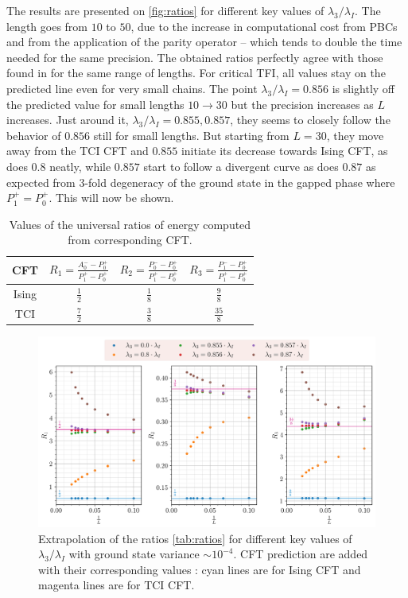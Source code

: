 	The results are presented on \autoref{fig:ratios} for different key values of $\lambda_3/\lambda_I$. The length goes from $10$ to $50$, due to the increase in computational cost from PBCs and from the application of the parity operator -- which tends to double the time needed for the same precision. The obtained ratios perfectly agree with those found in \cite{obrien2018} for the same range of lengths. For critical TFI, all values stay on the predicted line even for very small chains. The point $\lambda_3/\lambda_I=0.856$ is slightly off the predicted value for small lengths $10\to 30$ but the precision increases as $L$ increases. Just around it, $\lambda_3/\lambda_I=0.855, 0.857$, they seems to closely follow the behavior of $0.856$ still for small lengths. But starting from $L=30$, they move away from the TCI CFT and $0.855$ initiate its decrease towards Ising CFT, as does $0.8$ neatly, while $0.857$ start to follow a divergent curve as does $0.87$ as expected from $3$-fold degeneracy of the ground state in the gapped phase where $P^+_1 = P^+_0$. This will now be shown.

	\begin{table}[h!]
		\centering
		\renewcommand{\arraystretch}{1.3}
		\begin{tabular}{c|ccc}
			CFT & $R_1 = \frac{A^-_0 - P^+_0}{P^+_1 - P^+_0}$ & $R_2 = \frac{P^-_0 - P^+_0}{P^+_1 - P^+_0}$ & $R_3 = \frac{P^-_1 - P^+_0}{P^+_1 - P^+_0}$ \\
			\hline
			Ising & $\frac{1}{2}$ & $\frac{1}{8}$ & $\frac{9}{8}$ \\
			TCI & $\frac{7}{2}$ & $\frac{3}{8}$ & $\frac{35}{8}$
		\end{tabular}
		\caption{Values of the universal ratios of energy computed from corresponding CFT.}
		\label{tab:ratios}
	\end{table}

	\begin{figure}[h!]
		\centering
		\includegraphics[scale=0.66]{../graphs/ratios/J=1.0_h=1.0_i=1.0_c=0.0.png}
		\caption{Extrapolation of the ratios \autoref{tab:ratios} for different key values of $\lambda_3/\lambda_I$ with ground state variance $\sim 10^{-4}$. CFT prediction are added with their corresponding values : cyan lines are for Ising CFT and magenta lines are for TCI CFT.}
		\label{fig:ratios}
	\end{figure}

